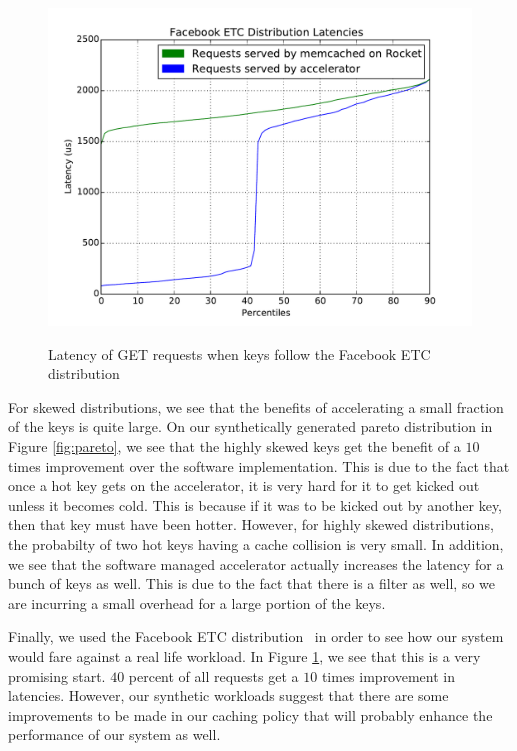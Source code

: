 \begin{figure}[t]
\begin{center}
\label{fig:etc}
\includegraphics[width=\linewidth]{etc.pdf}
\caption{Latency of GET requests when keys follow the Facebook ETC distribution}
\end{center}
\end{figure}

For skewed distributions, we see that the benefits of accelerating a small
fraction of the keys is quite large. On our synthetically generated pareto
distribution in Figure \ref{fig:pareto}, we see that the highly skewed keys get the
benefit of a $10$ times improvement over the software implementation. This is
due to the fact that once a hot key gets on the accelerator, it is very hard
for it to get kicked out unless it becomes cold. This is because if it was to
be kicked out by another key, then that key must have been hotter. However, for
highly skewed distributions, the probabilty of two hot keys having a cache
collision is very small. In addition, we see that the software managed
accelerator actually increases the latency for a bunch of keys as well. This is
due to the fact that there is a filter as well, so we are incurring a small
overhead for a large portion of the keys.

Finally, we used the Facebook ETC distribution~\cite{AXFJP2012} in order to see
how our system would fare against a real life workload. In Figure
\ref{fig:etc}, we see that this is a very promising start. $40$ percent of all
requests get a $10$ times improvement in latencies. However, our synthetic
workloads suggest that there are some improvements to be made in our caching
policy that will probably enhance the performance of our system as well.
